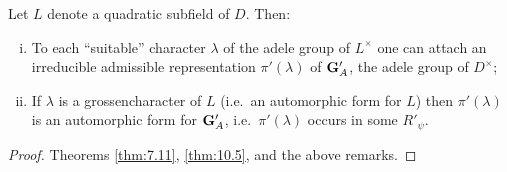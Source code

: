 \begin{theorem}\label{thm:10.8}

Let $L$ denote a quadratic subfield of $D$. Then:

\begin{enumerate}[(i)]

\item To each ``suitable'' character $\lambda$ of the adele group of $L^{\times}$ one can attach an irreducible admissible representation $\pi'(\lambda)$ of $\mathbf{G}'_A$, the adele group of $D^{\times}$;

\item If $\lambda$ is a grossencharacter of $L$ (i.e.\ an automorphic form for $L$) then $\pi'(\lambda)$ is an automorphic form for $\mathbf{G}'_A$, i.e.\ $\pi'(\lambda)$ occurs in some $R'_\psi$.

\end{enumerate}

\end{theorem}

\begin{proof}

Theorems \ref{thm:7.11}, \ref{thm:10.5}, and the above remarks.

\end{proof}


